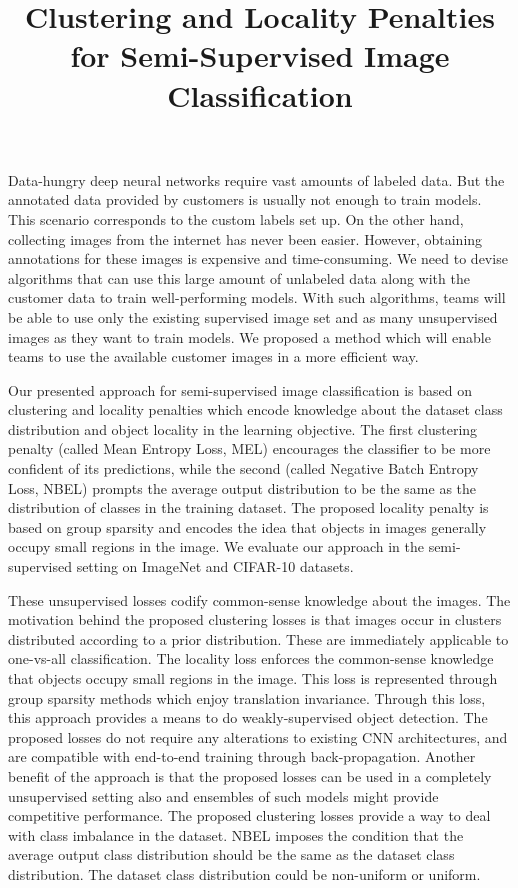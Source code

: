 \documentclass[10pt,letterpaper]{article}
\begin{document}
\title{Clustering and Locality Penalties for Semi-Supervised Image Classification}

\author{}

\maketitle

Data-hungry deep neural networks require vast amounts of labeled data. But the annotated data
provided by customers is usually not enough to train models. This scenario corresponds to the custom
labels set up. On the other hand, collecting images
from the internet has never been easier. However, obtaining annotations for these images is
expensive and time-consuming. We need to devise algorithms that can use this large amount of
unlabeled data along with the customer data to train well-performing models. With such algorithms,
teams will be able to use only the existing supervised image set and as many
unsupervised images as they want to train models. We proposed a method which will enable teams to
use the available customer images in a more efficient way. 

Our presented approach for semi-supervised image classification is based on clustering and locality
penalties which encode knowledge about the dataset class distribution and
object locality in the learning objective. The first clustering penalty (called Mean Entropy
Loss, MEL) encourages the classifier to be more confident of its predictions, while the second
(called Negative Batch Entropy Loss, NBEL) prompts the average output distribution to be the
same as the distribution of classes in the training dataset. The proposed locality penalty is
based on group sparsity and encodes the idea that objects in images generally occupy small
regions in the image. We evaluate our approach in the semi-supervised setting on ImageNet and CIFAR-10
datasets.

These unsupervised losses codify common-sense knowledge about
the images. The motivation behind the proposed clustering losses is that images occur in clusters
distributed according to a prior distribution. These are immediately applicable to one-vs-all
classification. The locality loss enforces the common-sense knowledge
that objects occupy small regions in the image. This loss is represented through group sparsity
methods which enjoy translation invariance. Through this loss, this approach provides a means to do
weakly-supervised object detection.
The proposed losses do not require any alterations to existing CNN architectures, and are
compatible with end-to-end training through back-propagation. Another benefit of the approach is
that the proposed losses can be used in a completely unsupervised setting also and ensembles of such
models might provide competitive performance. 
The proposed clustering losses provide a way to deal with class imbalance in the dataset. NBEL
imposes the condition that the average output class distribution should be the same as the dataset
class distribution. The dataset class distribution could be non-uniform or uniform. 
\end{document}

